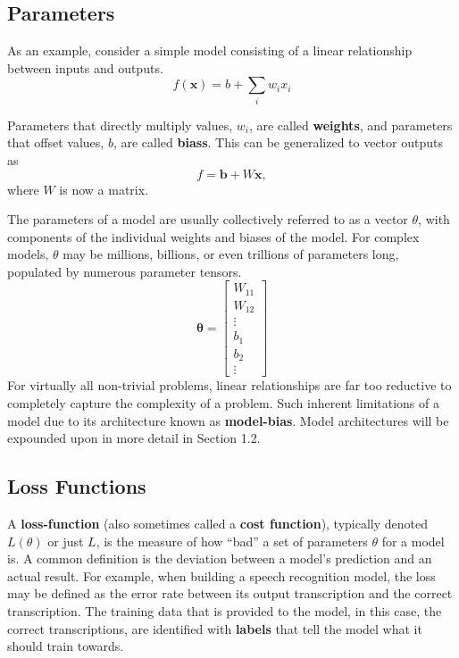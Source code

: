 \documentclass[12pt]{report}
\theoremstyle{definition}
\theoremstyle{remark}
\begin{document}
\subsection{Parameters}

As an example, consider a simple model consisting of a linear relationship between inputs and outputs.
\begin{equation}
    f(\mathbf{x}) = b +\sum_i w_i x_i
\end{equation}

Parameters that directly multiply values, $w_i$, are called \textbf{\glspl{weight}}, and parameters that offset values, $b$, are called \textbf{\glspl{bias}}. This can be generalized to vector outputs as
\begin{equation}
    f = \mathbf{b} + W\mathbf{x} ,
\end{equation}
where $W$ is now a matrix.

The parameters of a model are usually collectively referred to as a vector $\theta$, with components of the individual weights and biases of the model. For complex models, $\theta$ may be millions, billions, or even trillions of parameters long, populated by numerous parameter tensors.
\begin{equation}
    \mathbf{\theta} = \begin{bmatrix}
        W_{11} \\
        W_{12} \\
        \vdots \\
        b_1 \\
        b_2 \\
        \vdots
    \end{bmatrix}
\end{equation}
For virtually all non-trivial problems, linear relationships are far too reductive to completely capture the complexity of a problem. Such inherent limitations of a model due to its architecture known as \textbf{\gls{model-bias}}. Model architectures will be expounded upon in more detail in Section 1.2.

\subsection{Loss Functions}

A \textbf{\gls{loss-function}} (also sometimes called a \textbf{cost function}), typically denoted $L(\theta)$ or just $L$, is the measure of how ``bad'' a set of parameters $\theta$ for a model is. A common definition is the deviation between a model's prediction and an actual result. For example, when building a speech recognition model, the loss may be defined as the error rate between its output transcription and the correct transcription. The training data that is provided to the model, in this case, the correct transcriptions, are identified with \textbf{\glspl{label}} that tell the model what it should train towards.
\end{document}
